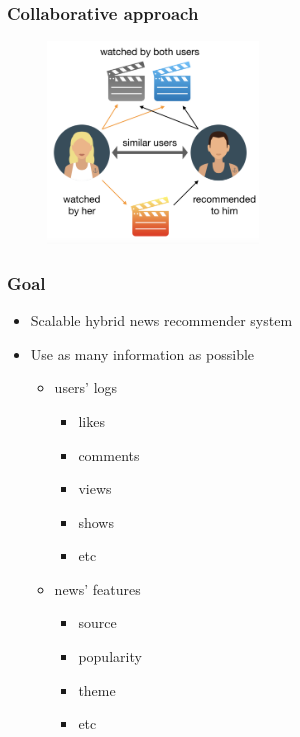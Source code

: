\documentclass[xetex,mathserif,serif]{beamer}
\begin{document}
\begin{frame}
	\frametitle{Collaborative approach}

	\begin{figure}[h]
		\includegraphics[width=0.5\textwidth]{./images/collaborative.png}
		\centering
	\end{figure}
\end{frame}



\begin{frame}
	\frametitle{Goal}

	\begin{itemize}
		\item Scalable hybrid news recommender system
		\item Use as many information as possible
		      \begin{itemize}
			      \item users' logs
			            \begin{itemize}
				            \item likes
				            \item comments
				            \item views
				            \item shows
				            \item etc
			            \end{itemize}
			      \item news' features
			            \begin{itemize}
				            \item source
				            \item popularity
				            \item theme
				            \item etc
			            \end{itemize}
		      \end{itemize}
	\end{itemize}
\end{frame}
\end{document}
